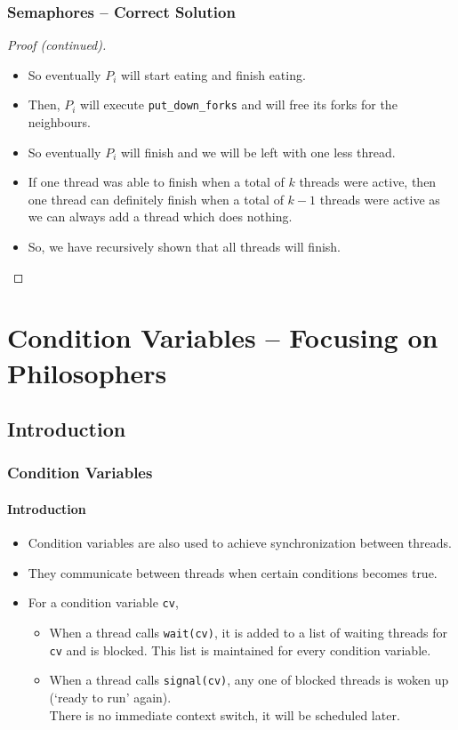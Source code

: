 \documentclass[aspectratio=169, handout, 10pt]{beamer}
\theoremstyle{example}
\begin{document}
\begin{frame}[fragile]\frametitle{Semaphores -- Correct Solution}%
  \begin{proof}[Proof (continued)]
  \begin{itemize}
  \pause\item So eventually $P_i$ will start eating and finish eating.
  \pause\item Then, $P_i$ will execute \verb!put_down_forks! and will free its forks for the neighbours.
  \pause\item So eventually $P_i$ will finish and we will be left with one less thread.
  \pause\item If one thread was able to finish when a total of $k$ threads were active, then one thread can definitely finish when a total of $k-1$ threads were active as we can always add a thread which does nothing.%
  \pause\item So, we have recursively shown that all threads will finish.
  \end{itemize}
\end{proof}
\end{frame}
\section{Condition Variables -- Focusing on Philosophers}
\subsection{Introduction}
\begin{frame}[fragile]\frametitle{Condition Variables}\framesubtitle{Introduction}
\begin{itemize}
\pause\item Condition variables are also used to achieve synchronization between threads.
\pause\item They communicate between threads when certain conditions becomes true.
\pause\item For a condition variable \verb!cv!,
  \begin{itemize}
  \pause\item When a thread calls \verb!wait(cv)!, it is added to a list of waiting threads for \verb!cv! and is blocked. This list is maintained for every condition variable.
  \pause\item When a thread calls \verb!signal(cv)!, any one of blocked threads is woken up (`ready to run' again).\\There is no immediate context switch, it will be scheduled later.
  \end{itemize}
\end{itemize}
\end{frame}
\end{document}

